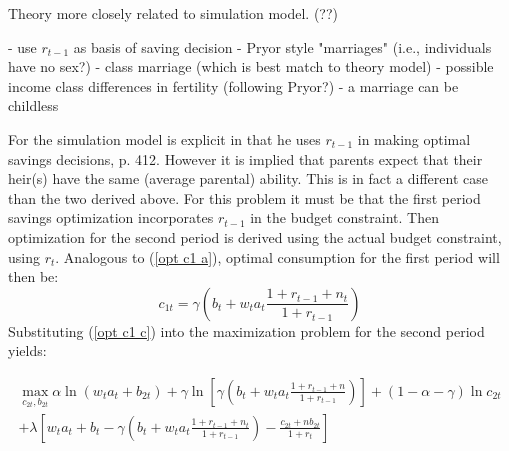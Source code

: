 \documentclass{article}
\begin{document}
Theory more closely related to simulation model. (??)

- use $r_{t-1}$ as basis of saving decision
- Pryor style "marriages" (i.e., individuals have no sex?)
- class marriage (which is best match to theory model)
- possible income class differences in fertility (following Pryor?)
- a marriage can be childless

For the simulation model \citet{pestieau-1984-oep} is explicit in that he uses $r_{t-1}$ in making optimal savings decisions, p. 412.  However it is implied that parents expect that their heir(s) have the same (average parental) ability.  This is in fact a different case than the two derived above.  For this problem it must be that the first period savings optimization incorporates $r_{t-1}$ in the budget constraint.  Then optimization for the second period is derived using the actual budget constraint, using $r_t$.  Analogous to (\ref{opt c1 a}), optimal consumption for the first period will then be:
\begin{equation}\label{opt c1 c}
c_{1t} = \gamma(b_t + w_t a_t\frac{1+r_{t-1}+n_t}{1+r_{t-1}} )
\end{equation}
Substituting (\ref{opt c1 c}) into the maximization problem for the second period yields:

\begin{equation}
\begin{split}
\max_{c_{2t}, b_{2t}} \alpha \ln (w_t a_{t} + b_{2t})
+ \gamma \ln [ \gamma(b_t+w_t a_{t} \frac{1+r_{t-1}+n}{1+r_{t-1}}) ]
+ (1-\alpha-\gamma) \ln c_{2t}\\
+ \lambda [ w_t a_t + b_t - \gamma(b_t +w_t a_t \frac{1+r_{t-1}+n_t}{1+r_{t-1}} ) - \frac{c_{2t} + n b_{2t}}{1+r_t}]
\end{split}
\end{equation}
\end{document}
